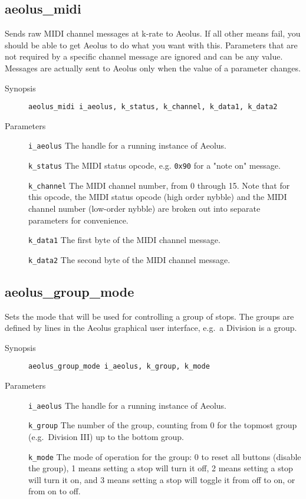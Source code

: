 \documentclass[english,11pt,letterpaper,onecolumn]{scrartcl}
\begin{document}
{\subsection*{aeolus\_midi}

Sends raw MIDI channel messages at k-rate to Aeolus. If all other means fail, you should be able to get Aeolus to do what you want with this. Parameters that are not required by a specific channel message are ignored and can be any value. Messages are actually sent to Aeolus only when the value of a parameter changes.

\begin{description}
	\item[Synopsis]
	\item[]\lstinline|aeolus_midi i_aeolus, k_status, k_channel, k_data1, k_data2|
	\item[Parameters]
	\item[]\lstinline|i_aeolus| The handle for a running instance of Aeolus.
	\item[]\lstinline|k_status| The MIDI status opcode, e.g. \verb|0x90| for a "note on" message.
	\item[]\lstinline|k_channel| The MIDI channel number, from 0 through 15. Note that for this opcode, the MIDI status opcode (high order nybble) and the MIDI channel number (low-order nybble) are broken out into separate parameters for convenience.
	\item[]\lstinline|k_data1| The first byte of the MIDI channel message.
	\item[]\lstinline|k_data2| The second byte of the MIDI channel message.
\end{description}

\subsection*{aeolus\_group\_mode}

Sets the mode that will be used for controlling a group of stops. The groups are defined by lines in the Aeolus graphical user interface, e.g.\ a Division is a group.

\begin{description}
	\item[Synopsis]
	\item[]\lstinline|aeolus_group_mode i_aeolus, k_group, k_mode|
	\item[Parameters]
	\item[]\lstinline|i_aeolus| The handle for a running instance of Aeolus.
	\item[]\lstinline|k_group| The number of the group, counting from 0 for the topmost group (e.g.\ Division III) up to the bottom group.
	\item[]\lstinline|k_mode| The mode of operation for the group: 0 to reset all buttons (disable the group), 1 means setting a stop will turn it off, 2 means setting a stop will turn it on, and 3 means setting a stop will toggle it from off to on, or from on to off.
\end{description}

}
\end{document}
